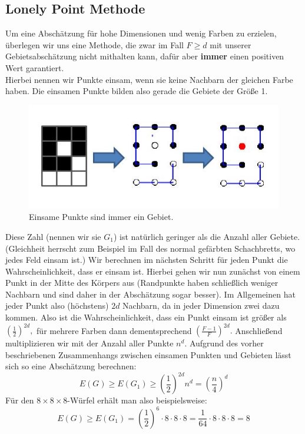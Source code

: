 \documentclass[11pt,a4paper]{article}
\numberwithin{equation}{section}
\numberwithin{table}{section}
\numberwithin{figure}{section}
\begin{document}
\subsection{Lonely Point Methode}
Um eine Abschätzung für hohe Dimensionen und wenig Farben zu erzielen, überlegen wir uns eine Methode, die zwar im Fall $F\geq d$ mit unserer Gebietsabschätzung nicht mithalten kann, dafür aber \textbf{immer} einen positiven Wert garantiert.\\
Hierbei nennen wir Punkte einsam, wenn sie keine Nachbarn der gleichen Farbe haben. Die einsamen Punkte bilden also gerade die Gebiete der Größe 1.
\begin{center}
\begin{figure}[H]\label{lonely}
\begin{center}\includegraphics[scale=1]{Lonely.JPG}
\caption{Einsame Punkte sind immer ein Gebiet.}\end{center}
\end{figure}
\end{center}
Diese Zahl (nennen wir sie $G_1$) ist natürlich geringer als die Anzahl aller Gebiete. (Gleichheit herrscht zum Beispiel im Fall des normal gefärbten Schachbretts, wo jedes Feld einsam ist.)
Wir berechnen im nächsten Schritt für jeden Punkt die Wahrscheinlichkeit, dass er einsam ist. Hierbei gehen wir nun zunächst von einem Punkt in der Mitte des Körpers aus (Randpunkte haben schließlich weniger Nachbarn und sind daher in der Abschätzung sogar besser). Im Allgemeinen hat jeder Punkt also (höchstens) $2d$ Nachbarn, da in jeder Dimension zwei dazu kommen. Also ist die Wahrscheinlichkeit, dass ein Punkt einsam ist größer als $\left(\frac{1}{2}\right)^{2d},$
für mehrere Farben dann dementsprechend $\left(\frac{F-1}{F}\right)^{2d}.$
Anschließend multiplizieren wir mit der Anzahl aller Punkte $n^d$. Aufgrund des vorher beschriebenen Zusammenhangs zwischen einsamen Punkten und  Gebieten lässt sich so eine Abschätzung berechnen:
$$E(G)\geq E(G_1)\geq \left(\frac{1}{2}\right)^{2d}n^d=\left(\frac{n}{4}\right)^d$$
Für den $8 \times 8 \times 8$-Würfel erhält man also beispielsweise:
$$E(G)\geq E(G_1)=\left(\frac{1}{2}\right)^6\cdot8 \cdot 8 \cdot 8=\frac{1}{64}\cdot 8 \cdot 8 \cdot 8=8$$
\end{document}

